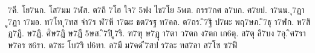 {7คี.
โย7นก.
โส7มม
7ฬส.
ต7ถิ
7โฮ
ใจ7
5ฟง
ไช7โย
5พต.
กรร7กศ
ล7บก.
ศ7ยป.
า7นน.
ุ7ฎา
ู7ฏา
า7มอ.
ท7โท
ุ7ทส
จ่า7ร
ฬ7หี
า7ฒะ
ธต7รฐ
ท7คล.
ต7ถร.
ิ7ฐิ
ป7ผะ
พฤ7ษภ.
ิ7ธุ
า7ฬก.
ห7สิ
ฏ7ฏิ.
ษ7ฏิ.
ศิษ7ฎิ
ษ7ฏี
5ษส.
ิ7ปิ
ู7ริ.
ฑ7ฑุ
ษ7ฏุ
า7ตา
ว7ตก
ง7ตก
เก6ตุ.
ส7ตุ
ลิ7บง
7อุ.
ิศ7รา
ษ7อร
ช6รา.
ด7ชะ
โบ7ริ
ป6ทา.
ล7มี
ม7คด
ี7สป
ร7ละ
ทส7ลา
ส7โซ
ซ7ฟี
}
